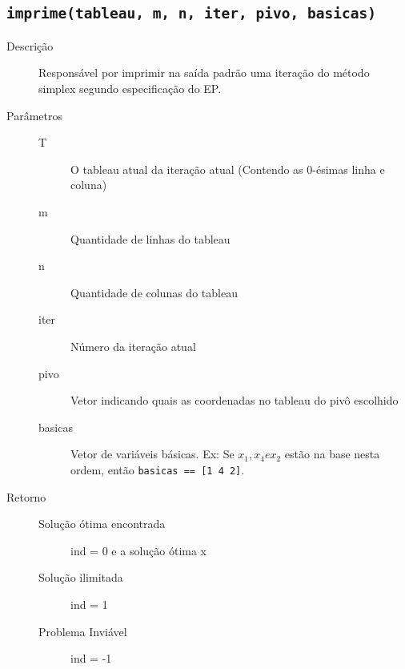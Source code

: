 \documentclass[brazil,times]{abnt}
\begin{document}
\subsection*{\texttt{imprime(tableau, m, n, iter, pivo, basicas)}}
\begin{description}
	\item[Descrição] Responsável por imprimir na saída padrão uma iteração do método simplex segundo especificação do EP.
	\item[Parâmetros] 
		\begin{description}
		 \item[T] O tableau atual da iteração atual (Contendo as 0-ésimas linha e coluna)
		 \item[m] Quantidade de linhas do tableau
		 \item[n] Quantidade de colunas do tableau
		 \item[iter] Número da iteração atual
		 \item[pivo] Vetor indicando quais as coordenadas no tableau do pivô escolhido
		 \item[basicas] Vetor de variáveis básicas. Ex: Se $x_1, x_4 e x_2$ estão na base nesta ordem, então \texttt{basicas == [1 4 2]}.
		\end{description}
	\item[Retorno]
		\begin{description}
		 \item[Solução ótima encontrada] ind = 0 e a solução ótima x
		 \item[Solução ilimitada] ind = 1
		 \item[Problema Inviável] ind = -1
		\end{description}
\end{description}
\end{document}
